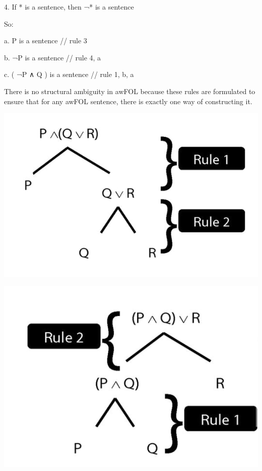\documentclass[12pt]{extarticle}
\begin{document}
\begin{multicols*}{3}
4. If * is a sentence, then ¬* is a sentence
 
So:
 
a. P is a sentence // rule 3
 
b. ¬P is a sentence // rule 4, a
 
c. ( ¬P ∧ Q ) is a sentence // rule 1, b, a
 
There is no structural ambiguity in awFOL because these rules are formulated to ensure that for any awFOL sentence, there is exactly one way of constructing it.
 
\begin{center}
\includegraphics[scale=0.3]{img/unit_230_tree1.png}
\end{center}
\begin{center}
\includegraphics[scale=0.3]{img/unit_230_tree2.png}
\end{center}
\begin{center}

\end{center}
\end{multicols*}
\end{document}
